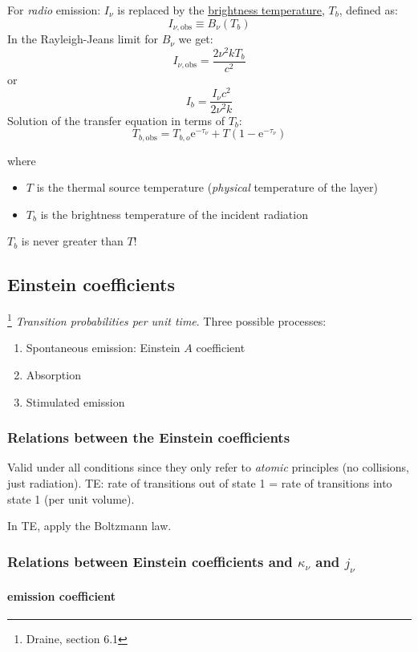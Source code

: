 \documentclass[12pt]{article}
\begin{document}
For \emph{radio} emission: $I_{\nu}$ is replaced by the \underline{brightness temperature},
$T_{b}$, defined as:$${
    I_{\nu,\mathrm{obs}} \equiv B_{\nu}(T_b)
}$$
In the Rayleigh-Jeans limit for $B_{\nu}$ we get:$${
    I_{\nu,\mathrm{obs}} = \frac{2\nu^{2}kT_{b}}{c^{2}}
}$$ or $${
    I_{b} = \frac{I_{\nu}c^{2}}{2\nu^{2}k}
}$$
Solution of the transfer equation in terms of $T_{b}$:$${
    T_{b,\mathrm{obs}} = T_{b,o}\mathrm{e}^{-\tau_{\nu}} + T(1-\mathrm{e}^{-\tau_{\nu}})
}$$

where
\begin{itemize}
    \item $T$ is the thermal source temperature (\emph{physical} temperature of the layer)
    \item $T_{b}$ is the brightness temperature of the incident radiation
\end{itemize}
\textcolor{bred}{$T_{b}$ is never greater than $T$!}

\subsection{Einstein coefficients}\footnote{Draine, section 6.1}
\emph{Transition probabilities per unit time}. Three possible processes:
\begin{enumerate}
    \item Spontaneous emission: Einstein $A$ coefficient
    \item Absorption
    \item Stimulated emission
\end{enumerate}

\subsubsection{Relations between the Einstein coefficients}
Valid under all conditions since they only refer to \emph{atomic} principles
(no collisions, just radiation).
TE: rate of transitions out of state 1 = rate of transitions into state 1
(per unit volume).

In TE, apply the Boltzmann law.

\subsubsection{Relations between Einstein coefficients and $\kappa_{\nu}$ and $j_{\nu}$}
\paragraph{emission coefficient}
\end{document}
